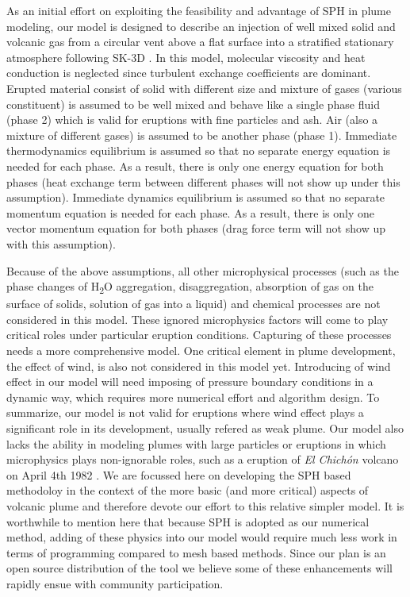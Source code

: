 \documentclass[journal abbreviation, manuscript]{copernicus}
\begin{document}
As an initial effort on exploiting the feasibility and advantage of SPH in plume modeling, our model is designed to describe an injection of well mixed solid and volcanic gas from a circular vent above a flat surface into a stratified stationary atmosphere following SK-3D \citep{suzuki2005numerical}. In this model, molecular viscosity and heat conduction is neglected since turbulent exchange coefficients are dominant. Erupted material consist of solid with different size and mixture of gases (various constituent) is assumed to be well mixed and behave like a single phase fluid (phase 2) which is valid for eruptions with fine particles and ash. Air (also a mixture of different gases) is assumed to be another phase (phase 1). Immediate thermodynamics equilibrium is assumed so that no separate energy equation is needed for each phase. As a result, there is only one energy equation for both phases (heat exchange term between different phases will not show up under this assumption). Immediate dynamics equilibrium is assumed so that no separate momentum equation is needed for each phase. As a result, there is only one vector momentum equation for both phases (drag force term will not show up with this assumption). 

Because of the above assumptions, all other microphysical processes (such as the phase changes of \texorpdfstring{H\textsubscript{2}O}, aggregation, disaggregation, absorption of gas on the surface of solids, solution of gas into a liquid) and chemical processes are not considered in this model. These ignored microphysics factors will come to play critical roles under particular eruption conditions. Capturing of these processes needs a more comprehensive model. One critical element in plume development, the effect of wind, is also not considered in this model yet. Introducing of wind effect in our model will need imposing of pressure boundary conditions in a dynamic way, which requires more numerical effort and algorithm design. To summarize, our model is not valid for eruptions where wind effect plays a significant role in its development, usually refered as weak plume. Our model also lacks the ability in modeling plumes with large particles or eruptions in which microphysics plays non-ignorable roles, such as a eruption of \textit{El Chich{\'o}n} volcano on April 4th 1982 \citep{sigurdsson19841982, folch2016fplume}. We are focussed here on developing the SPH based methodoloy in the context of the more basic (and more critical) aspects of volcanic plume and therefore devote our effort to this relative simpler model. It is worthwhile to mention here that because SPH is adopted as our numerical method, adding of these physics into our model would require much less work in terms of programming compared to mesh based methods. Since our plan is an open source distribution of the tool we believe some of these enhancements will rapidly ensue with community participation.
\end{document}
